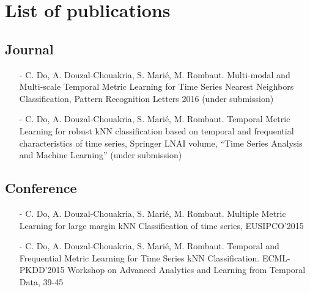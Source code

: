 \chapter*{List of publications}
\label{sec:article}

\section*{Journal}
\begin{itemize}
	\item[-] C. Do, A. Douzal-Chouakria, S. Marié, M. Rombaut. Multi-modal and Multi-scale Temporal Metric Learning for Time Series Nearest Neighbors Classification, Pattern Recognition Letters 2016 (under submission) 
	\item[-] C. Do, A. Douzal-Chouakria, S. Marié, M. Rombaut. Temporal Metric Learning for robust kNN classification based on temporal and frequential characteristics of time series,  Springer LNAI volume, “Time Series Analysis and Machine Learning” (under submission) 
\end{itemize}
	
\section*{Conference}
\begin{itemize}
	\item[-] C. Do, A. Douzal-Chouakria, S. Marié, M. Rombaut. Multiple Metric Learning for large margin kNN Classification of time series, EUSIPCO'2015 
	\item[-] C. Do, A. Douzal-Chouakria, S. Marié, M. Rombaut. Temporal and Frequential Metric Learning for Time Series kNN Classification. ECML-PKDD'2015 Workshop on Advanced Analytics and Learning from Temporal Data, 39-45
\end{itemize}
